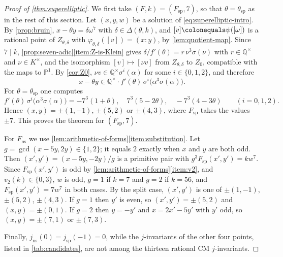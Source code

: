 \documentclass[12pt]{amsart}
\renewcommand{\P}{\mathbb{P}}
\newcommand{\Q}{\mathbb{Q}}
\newcommand{\Pone}{\P^{1}}
\DeclareMathOperator{\ns}{ns}
\DeclareMathOperator{\spc}{sp}
\numberwithin{equation}{section}
\theoremstyle{definition}
\begin{document}
\begin{proof}[Proof of \cref{thm:superelliptic}]
  We first take $(F,k) = (F_{\spc},7)$, so that $\theta = \theta_{\spc}$ as in
  the rest of this section. Let $(x,y,w)$ be a solution of
  \cref{eq:superelliptic-intro}. By \cref{prop:bruin}, $x - \theta y = \delta\omega^7$ with $\delta \in \Delta(\theta,k)$, and
  $[v] \colonequals \psi([\omega])$ is a rational point of $Z_{\theta,\delta}$
  with $\varphi_{\theta,\delta}([v]) = (x:y)$, by \cref{lem:quotient-map}. Since
  $7 \mid k$, \cref{prop:seven-adic}\eqref{item:Z-is-Klein} gives
  $\delta/f'(\theta) = r\,\nu^{3}\sigma(\nu)$ with $r \in \Q^{\times}$ and $\nu
  \in K^{\times}$, and the isomorphism $[v] \mapsto [\nu v]$ from
  $Z_{\theta,\delta}$ to $Z_0$, compatible with the maps to $\Pone$. By \cref{cor:Z0}, $\nu v \in
  \Q^{\times}\sigma^{i}(\alpha)$ for some $i \in \{0,1,2\}$, and therefore
  \[
    x - \theta y \in \Q^{\times}\cdot f'(\theta)\,\sigma^{i}\bigl(\alpha^{3}\sigma(\alpha)\bigr).
  \]
  For $\theta = \theta_{\spc}$ one computes
  \begin{equation}
    \label{eq:certificates}
    f'(\theta)\,\sigma^{i}\bigl(\alpha^{3}\sigma(\alpha)\bigr) =
    -7^{3}(1 + \theta),\quad 7^{3}(5 - 2\theta),\quad -7^{3}(4 - 3\theta)
    \qquad (i = 0,1,2).
  \end{equation}
  Hence $(x,y) = \pm(1,-1)$, $\pm(5,2)$ or $\pm(4,3)$, where $F_{\spc}$ takes
  the values $\pm 7$. This proves the theorem for $(F_{\spc},7)$.

  For $F_{\ns}$ we use \cref{lem:arithmetic-of-forms}\eqref{item:substitution}.
  Let $g = \gcd(x - 5y, 2y) \in \{1,2\}$; it equals $2$ exactly when $x$ and
  $y$ are both odd. Then $(x',y') = (x-5y,-2y)/g$ is a primitive pair with
  $g^{3}F_{\spc}(x',y') = kw^7$. Since $F_{\spc}(x',y')$ is odd by
  \cref{lem:arithmetic-of-forms}\eqref{item:v2}, and $v_2(k) \in
  \{0,3\}$, $w$ is odd, $g = 1$ if $k = 7$ and $g = 2$ if $k = 56$, and
  $F_{\spc}(x',y') = 7w^{7}$ in both cases. By the split case, $(x',y')$ is one
  of $\pm(1,-1)$, $\pm(5,2)$, $\pm(4,3)$. If $g = 1$ then $y'$ is even, so
  $(x',y') = \pm(5,2)$ and $(x,y) = \pm(0,1)$. If $g = 2$ then $y = -y'$ and $x
  = 2x' - 5y'$ with $y'$ odd, so $(x,y) = \pm(7,1)$ or $\pm(7,3)$.

  Finally, $j_{\ns}(0) = j_{\spc}(-1) = 0$, while the $j$-invariants of the
  other four points, listed in \cref{tab:candidates}, are not among the thirteen
  rational CM $j$-invariants.
\end{proof}
\end{document}
